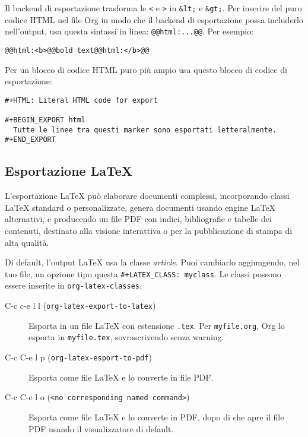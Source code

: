 \documentclass[11pt]{article}
\begin{document}
Il backend di esportazione trasforma le \texttt{<} e \texttt{>} in \texttt{\&lt;} e \texttt{\&gt;}.
Per inserire del puro codice HTML nel file Org in modo che il backend
di esportazione possa includerlo nell'output, usa questa sintassi in
linea: \texttt{@@html:...@@}. Per esempio:

\begin{verbatim}
@@html:<b>@@bold text@@html:</b>@@
\end{verbatim}


Per un blocco di codice HTML puro più ampio usa questo blocco di
codice di esportazione:

\begin{verbatim}
#+HTML: Literal HTML code for export

#+BEGIN_EXPORT html
  Tutte le linee tra questi marker sono esportati letteralmente.
#+END_EXPORT
\end{verbatim}

\subsection{Esportazione \LaTeX{}}
\label{sec:org07c6219}
L'esportazione \LaTeX{} può elaborare documenti complessi, incorporando
classi \LaTeX{} standard o personalizzate, genera documenti usando engine
\LaTeX{} alternativi, e producendo un file PDF con indici,
bibliografie e tabelle dei contenuti, destinato alla visione
interattiva o per la pubblicazione di stampa di alta qualità.

Di default, l'output \LaTeX{} usa la classe \emph{article}. Puoi cambiarlo
aggiungendo, nel tuo file, un opzione tipo questa \texttt{\#+LATEX\_CLASS:
myclass}. Le classi possono essere inserite in \texttt{org-latex-classes}.

\begin{description}
\item[{C-c c-e l l (\texttt{org-latex-export-to-latex})}] Esporta in un file \LaTeX{} con estensione \texttt{.tex}. Per \texttt{myfile.org},
Org lo esporta in \texttt{myfile.tex}, sovrascrivendo senza warning.

\item[{C-c C-e l p (\texttt{org-latex-esport-to-pdf})}] Esporta come file \LaTeX{} e lo converte in file PDF.

\item[{C-c C-e l o (\texttt{<no corresponding named command>})}] Esporta come file \LaTeX{} e lo converte in PDF, dopo di che apre il
file PDF usando il visualizzatore di default.
\end{description}
\end{document}
